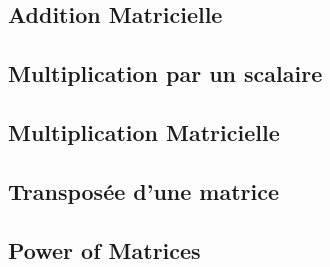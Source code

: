 \documentclass{article}
\begin{document}
\subsection{Addition Matricielle}

\begin{definition}
\end{definition}

\begin{theorem}
\end{theorem}

\subsection{Multiplication par un scalaire}

\begin{definition}
\end{definition}

\begin{theorem}
\end{theorem}

\subsection{Multiplication Matricielle}

\begin{definition}
\end{definition}

\begin{theorem}
\end{theorem}

\subsection{Transposée d'une matrice}
\begin{definition}
\end{definition}

\begin{theorem}
\end{theorem}

\subsection{Power of Matrices}%
\label{sub:Power of Matrices}
\end{document}
